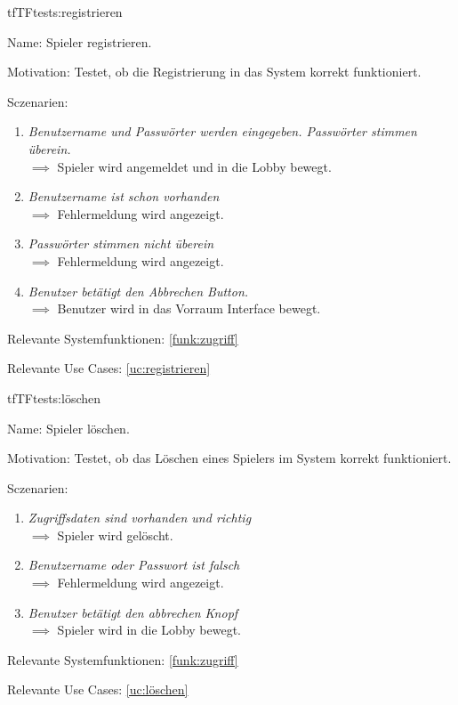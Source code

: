 \begin{description}[leftmargin=5em, style=sameline]
{
\begin{lhp}{tf}{TF}{tests:registrieren}
	\item [Name:] Spieler registrieren.
	\item [Motivation:] Testet, ob die Registrierung in das System korrekt funktioniert.
	\item [Sczenarien:] \hfill
		\begin{enumerate}
		    \item \textit{Benutzername und Passwörter werden eingegeben. Passwörter stimmen überein.} \\ $\implies$ Spieler wird angemeldet und in die Lobby bewegt.
			\item \textit{Benutzername ist schon vorhanden} \\ $\implies$ Fehlermeldung wird angezeigt.
			\item \textit{Passwörter stimmen nicht überein} \\ $\implies$ Fehlermeldung wird angezeigt.
			\item \textit{Benutzer betätigt den Abbrechen Button.} \\ $\implies$ Benutzer wird in das Vorraum Interface bewegt.
		\end{enumerate}
	\item [Relevante Systemfunktionen:] \ref{funk:zugriff}
	\item [Relevante Use Cases:] \ref{uc:registrieren}
\end{lhp}
}

{
\begin{lhp}{tf}{TF}{tests:löschen}
	\item [Name:] Spieler löschen.
	\item [Motivation:] Testet, ob das Löschen eines Spielers im System korrekt funktioniert.
	\item [Sczenarien:] \hfill
		\begin{enumerate}
			\item \textit{Zugriffsdaten sind vorhanden und richtig} \\ $\implies$ Spieler wird gelöscht.
			\item \textit{Benutzername oder Passwort ist falsch} \\ $\implies$ Fehlermeldung wird angezeigt.
			\item \textit{Benutzer betätigt den abbrechen Knopf} \\ $\implies$ Spieler wird in die Lobby bewegt.
		\end{enumerate}
	\item [Relevante Systemfunktionen:] \ref{funk:zugriff}
	\item [Relevante Use Cases:] \ref{uc:löschen}
\end{lhp}
}


\end{description}
